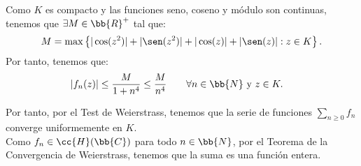 \documentclass[12pt]{article}
\begin{document}
\begin{ejercicio}[2.5 puntos]
\begin{enumerate}
            Como $K$ es compacto y las funciones seno, coseno y módulo son continuas, tenemos que $\exists M\in \bb{R}^+$ tal que:
            \begin{align*}
                M = \max\left\{|\cos(z^2)| + |\sen(z^2)| + |\cos(z)| + |\sen(z)| : z\in K\right\}.
            \end{align*}
            Por tanto, tenemos que:
            \begin{align*}
                \left|f_n(z)\right| &\leq \frac{M}{1+n^4}\leq \frac{M}{n^4}\qquad \forall n\in \bb{N} \text{ y } z\in K.
            \end{align*}

            Por tanto, por el Test de Weierstrass, tenemos que la serie de funciones $\sum\limits_{n\geq 0} f_n$ converge uniformemente en $K$.\\

            Como $f_n\in \cc{H}(\bb{C})$ para todo $n\in \bb{N}$, por el Teorema de la Convergencia de Weierstrass, tenemos que la suma es una función entera.
        \end{enumerate}
    \end{ejercicio}
\end{document}
